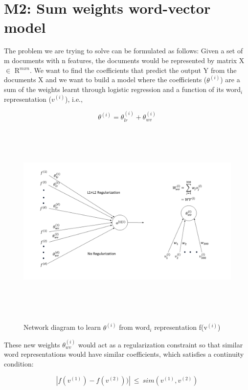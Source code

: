 \section{M2: Sum weights word-vector model} 

The problem we are trying to solve can be formulated as follows: Given a set of m documents with n features, the documents would be represented by matrix X $\in$ R$^{m x n}$. We want to find the coefficients that predict the output Y from the documents X and we want to build a model where the coefficients ($\theta^{(i)}$) are a sum of the weights learnt through logistic regression and a function of its word$_{i}$ representation ($v^{(i)}$), i.e.,

\begin{equation}\label{lb1}
\theta^{(i)} = \theta_{lr}^{(i)} + \theta_{wv}^{(i)}
\end{equation}


\begin{figure}[htbp]
\centering
\includegraphics[width=16cm, height=10cm]{images/proposed_method.png}\\
\centering
\caption{Network diagram to learn $\theta^{(i)}$ from word$_{i}$ representation f(v$^{(i)}$)}
\label{fig:foo}
\end{figure}


These new weights $\theta_{wv}^{(i)}$ would act as a regularization constraint so that similar word representations would have similar coefficients, which satisfies a continuity condition:

\begin{equation}
|f(v^{(1)}) - f(v^{(2)}))|\ \leq\ sim(v^{(1)}, v^{(2)})
\end{equation}

